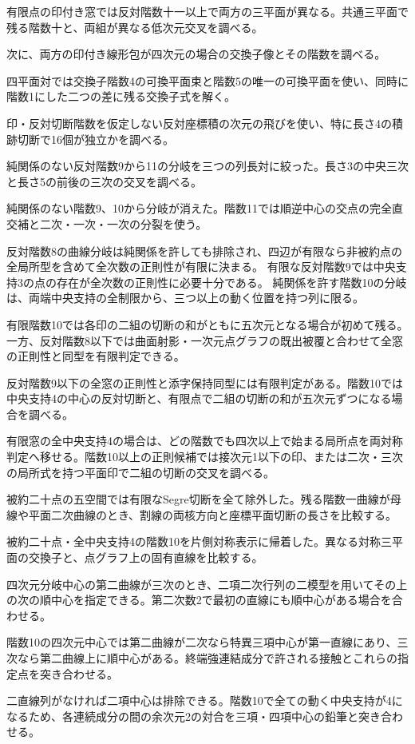\documentclass[11pt,a4paper]{ltjsarticle}
\begin{document}
有限点の印付き窓では反対階数十一以上で両方の三平面が異なる。共通三平面で残る階数十と、両組が異なる低次元交叉を調べる。

次に、両方の印付き線形包が四次元の場合の交換子像とその階数を調べる。

四平面対では交換子階数4の可換平面束と階数5の唯一の可換平面を使い、同時に階数1にした二つの差に残る交換子式を解く。

印・反対切断階数を仮定しない反対座標積の次元の飛びを使い、特に長さ4の積跡切断で16個が独立かを調べる。

純関係のない反対階数9から11の分岐を三つの列長対に絞った。長さ3の中央三次と長さ5の前後の三次の交叉を調べる。

純関係のない階数9、10から分岐が消えた。階数11では順逆中心の交点の完全直交補と二次・一次・一次の分裂を使う。

反対階数8の曲線分岐は純関係を許しても排除され、四辺が有限なら非被約点の全局所型を含めて全次数の正則性が有限に決まる。
有限な反対階数9では中央支持3の点の存在が全次数の正則性に必要十分である。
純関係を許す階数10の分岐は、両端中央支持の全制限から、三つ以上の動く位置を持つ列に限る。


有限階数10では各印の二組の切断の和がともに五次元となる場合が初めて残る。一方、反対階数8以下では曲面射影・一次元点グラフの既出被覆と合わせて全窓の正則性と同型を有限判定できる。


反対階数9以下の全窓の正則性と添字保持同型には有限判定がある。階数10では中央支持4の中心の反対切断と、有限点で二組の切断の和が五次元ずつになる場合を調べる。

有限窓の全中央支持4の場合は、どの階数でも四次以上で始まる局所点を両対称判定へ移せる。階数10以上の正則候補では接次元1以下の印、または二次・三次の局所式を持つ平面印で二組の切断の交叉を調べる。

被約二十点の五空間では有限なSegre切断を全て除外した。残る階数一曲線が母線や平面二次曲線のとき、割線の両核方向と座標平面切断の長さを比較する。

被約二十点・全中央支持4の階数10を片側対称表示に帰着した。異なる対称三平面の交換子と、点グラフ上の固有直線を比較する。

四次元分岐中心の第二曲線が三次のとき、二項二次行列の二模型を用いてその上の次の順中心を指定できる。第二次数2で最初の直線にも順中心がある場合を合わせる。

階数10の四次元中心では第二曲線が二次なら特異三項中心が第一直線にあり、三次なら第二曲線上に順中心がある。終端強連結成分で許される接触とこれらの指定点を突き合わせる。

二直線列がなければ二項中心は排除できる。階数10で全ての動く中央支持が4になるため、各連続成分の間の余次元2の対合を三項・四項中心の鉛筆と突き合わせる。
\end{document}
